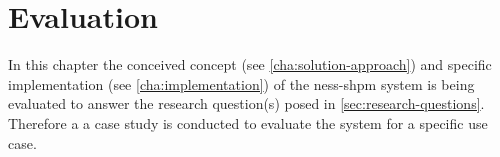 \documentclass[11pt]{scrreprt}
\begin{document}
{%
%
%






\chapter{Evaluation}
\label{cha:evaluation}
In this chapter the conceived concept (see \cref{cha:solution-approach}) and specific implementation (see \cref{cha:implementation}) of the \gls{ness-shpm} system is being evaluated to answer the research question(s) posed in \cref{sec:research-questions}. Therefore a a case study is conducted to evaluate the system for a specific use case. 


}
\end{document}
